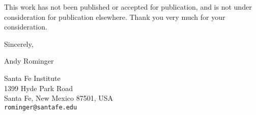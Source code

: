 \documentclass[12pt]{article}
\begin{document}
This work has not been published or accepted for publication, and is
not under consideration for publication elsewhere. Thank you very much
for your consideration.
\vspace{2em}

\noindent
Sincerely,
\vspace{2em}

\noindent
Andy Rominger

\noindent
Santa Fe Institute \\
1399 Hyde Park Road \\
Santa Fe, New Mexico 87501, USA \\
{\tt rominger@santafe.edu}

\printbibliography
\end{document}
